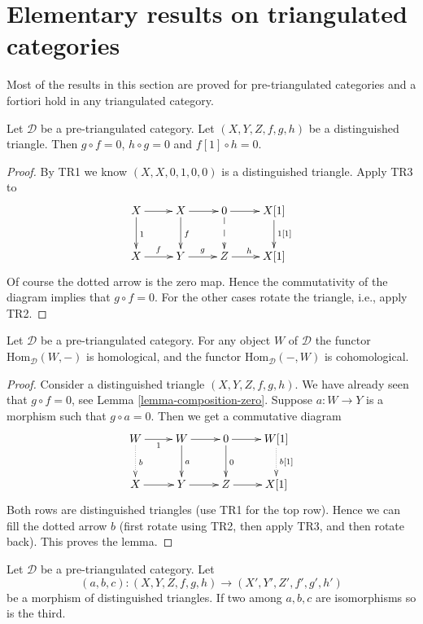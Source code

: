 \section{Elementary results on triangulated categories}
\label{section-elementary-results}

\noindent
Most of the results in this section are proved for pre-triangulated categories
and a fortiori hold in any triangulated category.

\begin{lemma}
\label{lemma-composition-zero}
Let $\mathcal{D}$ be a pre-triangulated category.
Let $(X, Y, Z, f, g, h)$ be a distinguished triangle.
Then $g \circ f = 0$,
$h \circ g = 0$ and $f[1] \circ h = 0$.
\end{lemma}

\begin{proof}
By TR1 we know $(X, X, 0, 1, 0, 0)$ is a distinguished triangle.
Apply TR3 to
$$
\xymatrix{
X \ar[r] \ar[d]^1 &
X \ar[r] \ar[d]^f &
0 \ar[r] \ar@{-->}[d] &
X[1] \ar[d]^{1[1]} \\
X \ar[r]^f &
Y \ar[r]^g &
Z \ar[r]^h &
X[1]
}
$$
Of course the dotted arrow is the zero map. Hence the commutativity of
the diagram implies that $g \circ f = 0$. For the other cases
rotate the triangle, i.e., apply TR2.
\end{proof}

\begin{lemma}
\label{lemma-representable-homological}
Let $\mathcal{D}$ be a pre-triangulated category.
For any object $W$ of $\mathcal{D}$ the functor
$\text{Hom}_{\mathcal{D}}(W, -)$ is homological, and the functor
$\text{Hom}_{\mathcal{D}}(-, W)$ is cohomological.
\end{lemma}

\begin{proof}
Consider a distinguished triangle $(X, Y, Z, f, g, h)$.
We have already seen that $g \circ f = 0$, see
Lemma \ref{lemma-composition-zero}.
Suppose $a : W \to Y$ is a morphism such that $g \circ a = 0$.
Then we get a commutative diagram
$$
\xymatrix{
W \ar[r]_1 \ar@{..>}[d]^b &
W \ar[r] \ar[d]^a &
0 \ar[r] \ar[d]^0 &
W[1] \ar@{..>}[d]^{b[1]} \\
X \ar[r] & Y \ar[r] & Z \ar[r] & X[1]
}
$$
Both rows are distinguished triangles (use TR1 for the top row).
Hence we can fill the dotted arrow $b$ (first rotate using TR2,
then apply TR3, and then rotate back). This proves the lemma.
\end{proof}

\begin{lemma}
\label{lemma-third-isomorphism-triangle}
Let $\mathcal{D}$ be a pre-triangulated category.
Let
$$
(a, b, c) : (X, Y, Z, f, g, h) \to (X', Y', Z', f', g', h')
$$
be a morphism of distinguished triangles. If two among $a, b, c$
are isomorphisms so is the third.
\end{lemma}


